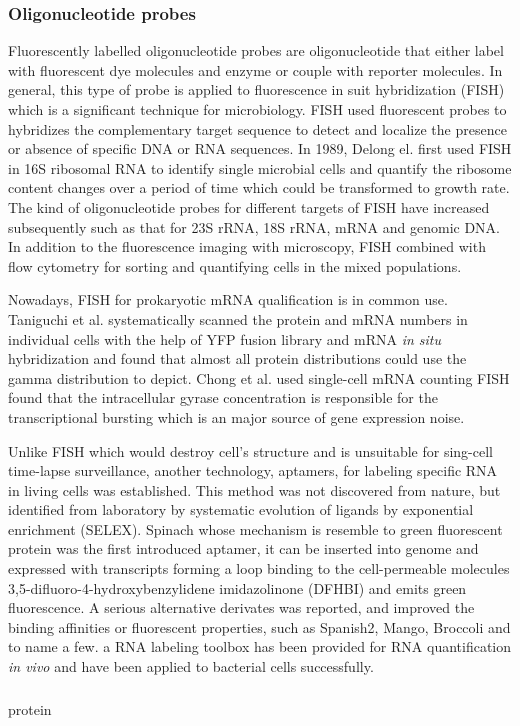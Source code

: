 \documentclass[fleqn,10pt]{wlscirep}
\begin{document}
\subsubsection[]{Oligonucleotide probes}

Fluorescently labelled oligonucleotide probes are oligonucleotide that either label with fluorescent dye molecules and enzyme or couple with reporter molecules. In general, this type of probe is applied to fluorescence in suit hybridization (FISH) which is a significant technique for microbiology\cite{Moter2000}. FISH used fluorescent probes to hybridizes the complementary target sequence to detect and localize the presence or absence of specific DNA or RNA sequences. In 1989, Delong el.\cite{DeLong1989} first used FISH in 16S ribosomal RNA to identify single microbial cells and quantify the ribosome content changes over a period of time which could be transformed to growth rate. The kind of oligonucleotide probes  for different targets of FISH have increased subsequently such as that for 23S rRNA\cite{Manz1993,Amann1995}, 18S rRNA\cite{Lischewski1996}, mRNA\cite{Wagner1998} and genomic DNA\cite{Zwirglmaier2004}. In addition to the fluorescence imaging with microscopy, FISH combined with flow cytometry for sorting and quantifying cells in the mixed populations\cite{Wallner1993}.

Nowadays, FISH for prokaryotic mRNA qualification is in common use. Taniguchi et al.\cite{Taniguchi2010} systematically scanned the protein and mRNA numbers in individual cells with the help of YFP fusion library and mRNA \emph{in situ} hybridization and found that almost all protein distributions could use the gamma distribution to depict. Chong et al.\cite{Chong2014} used single-cell mRNA counting FISH found that the intracellular gyrase concentration is responsible for the transcriptional bursting which is an major source of gene expression noise.

Unlike FISH which would destroy cell's structure and is unsuitable for sing-cell time-lapse surveillance, another technology, aptamers, for labeling specific RNA in living cells was established. This method was not discovered from nature, but identified from laboratory by systematic evolution of ligands by exponential enrichment (SELEX). Spinach\cite{Paige2011} whose mechanism is resemble to green fluorescent protein was the first introduced aptamer, it can be inserted into genome and expressed with transcripts forming a loop binding to the cell-permeable molecules 3,5-difluoro-4-hydroxybenzylidene imidazolinone (DFHBI) and emits green fluorescence. A serious alternative derivates was reported, and improved the binding affinities or fluorescent properties, such as Spanish2\cite{Strack2013}, Mango\cite{Dolgosheina2014}, Broccoli\cite{Filonov2014} and to name a few. a RNA labeling toolbox has been provided for RNA quantification \emph{in vivo} and have been applied to bacterial cells successfully\cite{Arora2015}. 

\subsubsection[]{}

protein

\end{document}
